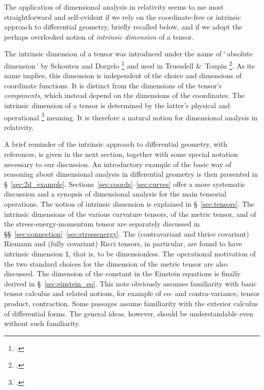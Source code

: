 \documentclass[a4paper,12pt,onecolumn,oneside,article,british]{memoir}
\newcommand*{\defquote}[1]{`\,#1\,'}
\newcommand*{\citep}{\footcites}
\newcommand*{\amp}{\&}
\newcommand*{\sect}{\S}%
\newcommand*{\sects}{\S\S}%
\newcommand*{\chap}{ch.}%
\newcommand*{\Un}{\textsf{1}}
\begin{document}
The application of dimensional analysis in relativity seems to me most
straightforward and self-evident if we rely on the coordinate-free or
intrinsic approach to differential geometry, briefly recalled below, and if
we adopt the perhaps overlooked notion of \emph{intrinsic dimension} of a
tensor. %

The intrinsic dimension of a tensor was
introduced under the name of \defquote{absolute dimension} by Schouten and
Dorgelo \citep{dorgeloetal1946}[\chap~VI]{schouten1951_r1989} and used in
Truesdell \amp\ Toupin \citep[Appendix II]{truesdelletal1960}. As its name
implies, this dimension is independent of the choice and dimensions of
coordinate functions. It is distinct from the dimensions of the tensor's
\emph{components}, which instead depend on the dimensions of the
coordinates. The intrinsic dimension of a tensor is determined by the
latter's physical and operational \citep{bridgman1927_r1958} meaning. It is
therefore a natural notion for dimensional analysis in relativity.

\medskip

A brief reminder of the intrinsic approach to differential geometry, with
references, is given in the next section, together with some special
notation necessary to our discussion. An introductory example of the basic
way of reasoning about dimensional analysis in differential geometry is
then presented in \sect~\ref{sec:2d_example}.
Sections~\ref{sec:coords}--\ref{sec:curves} offer a more systematic
discussion and a synopsis of dimensional analysis for the main tensorial
operations. The notion of intrinsic dimension is explained in
\sect~\ref{sec:tensors}. The intrinsic dimensions of the various curvature
tensors, of the metric tensor, and of the stress-energy-momentum tensor are
separately discussed in
\sects~\ref{sec:connection}--\ref{sec:stressenergy}. The (contravariant and
thrice covariant) Riemann and (fully covariant) Ricci tensors, in
particular, are found to have intrinsic dimension $\Un$, that is, to be
dimensionless. The operational motivation of the two standard choices for
the dimension of the metric tensor are also discussed. The dimension of the
constant in the Einstein equations is finally derived in
\sect~\ref{sec:einstein_eq}. This note obviously assumes familiarity with
basic tensor calculus and related notions, for example of co- and
contra-variance, tensor product, contraction. Some passages assume
familiarity with the exterior calculus of differential forms. The general
ideas, however, should be understandable even without such familiarity.
\end{document}
